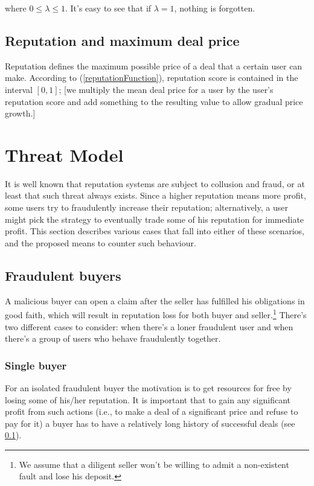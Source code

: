 \documentclass[11pt]{article}
\begin{document}
where $ 0 \leq \lambda \leq 1 $. It's easy to see that if $ \lambda = 1 $, nothing is forgotten.

\subsection{Reputation and maximum deal price} \label{reputation:maxDealprice}

Reputation defines the maximum possible price of a deal that a certain user can make. According to (\ref{reputationFunction}), reputation score is contained in the interval $ [0, 1] $; [we multiply the mean deal price for a user by the user's reputation score and add something to the resulting value to allow gradual price growth.]

\section{Threat Model}

It is well known \cite{ciccarelli2011collusion, maranzato2010fraud} that reputation systems are subject to collusion and fraud, or at least that such threat always exists. Since a higher reputation means more profit, some users try to fraudulently increase their reputation; alternatively, a user might 
pick the strategy to eventually trade some of his reputation for immediate profit. This section describes various cases that fall into either of these scenarios, and the proposed means to counter such behaviour.

\subsection{Fraudulent buyers}

A malicious buyer can open a claim after the seller has fulfilled his obligations in good faith, which will result in reputation loss for both buyer and seller.\footnote{We assume that a diligent seller won't be willing to admit a non-existent fault and lose his deposit.} There's two different cases to consider: when there's a loner fraudulent user and when there's a group of users who behave fraudulently together.

\subsubsection{Single buyer}

For an isolated fraudulent buyer the motivation is to get resources for free by losing some of his/her reputation. It is important that to gain any significant profit from such actions (i.e., to make a deal of a significant price and refuse to pay for it) a buyer has to have a relatively long history of successful deals (see \ref{reputation:maxDealprice}).
\end{document}
